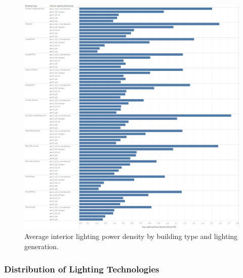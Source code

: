 \begin{figure}
    \centering \includegraphics[width=1\textwidth]{figures/interior_lighting_lpd.png}
    \caption[Average interior lighting power density by building type and lighting generation]{Average interior lighting power density by building type and lighting generation.}
    \label{fig:interior_lighting_lpd}
\end{figure}

\pagebreak
\subsubsection{Distribution of Lighting Technologies}

